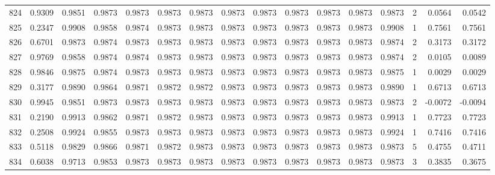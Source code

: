 \begin{tabular}{lrrrrrrrrrrrrrrr}
824 &      0.9309 &  0.9851 &  0.9873 &  0.9873 &  0.9873 &  0.9873 &  0.9873 &  0.9873 &  0.9873 &  0.9873 &   0.9873 &     0.9873 &      2 &                    0.0564 &                     0.0542 \\
825 &      0.2347 &  0.9908 &  0.9858 &  0.9874 &  0.9873 &  0.9873 &  0.9873 &  0.9873 &  0.9873 &  0.9873 &   0.9873 &     0.9908 &      1 &                    0.7561 &                     0.7561 \\
826 &      0.6701 &  0.9873 &  0.9874 &  0.9873 &  0.9873 &  0.9873 &  0.9873 &  0.9873 &  0.9873 &  0.9873 &   0.9873 &     0.9874 &      2 &                    0.3173 &                     0.3172 \\
827 &      0.9769 &  0.9858 &  0.9874 &  0.9874 &  0.9873 &  0.9873 &  0.9873 &  0.9873 &  0.9873 &  0.9873 &   0.9873 &     0.9874 &      2 &                    0.0105 &                     0.0089 \\
828 &      0.9846 &  0.9875 &  0.9874 &  0.9873 &  0.9873 &  0.9873 &  0.9873 &  0.9873 &  0.9873 &  0.9873 &   0.9873 &     0.9875 &      1 &                    0.0029 &                     0.0029 \\
829 &      0.3177 &  0.9890 &  0.9864 &  0.9871 &  0.9872 &  0.9872 &  0.9873 &  0.9873 &  0.9873 &  0.9873 &   0.9873 &     0.9890 &      1 &                    0.6713 &                     0.6713 \\
830 &      0.9945 &  0.9851 &  0.9873 &  0.9873 &  0.9873 &  0.9873 &  0.9873 &  0.9873 &  0.9873 &  0.9873 &   0.9873 &     0.9873 &      2 &                   -0.0072 &                    -0.0094 \\
831 &      0.2190 &  0.9913 &  0.9862 &  0.9871 &  0.9872 &  0.9873 &  0.9873 &  0.9873 &  0.9873 &  0.9873 &   0.9873 &     0.9913 &      1 &                    0.7723 &                     0.7723 \\
832 &      0.2508 &  0.9924 &  0.9855 &  0.9873 &  0.9873 &  0.9873 &  0.9873 &  0.9873 &  0.9873 &  0.9873 &   0.9873 &     0.9924 &      1 &                    0.7416 &                     0.7416 \\
833 &      0.5118 &  0.9829 &  0.9866 &  0.9871 &  0.9872 &  0.9873 &  0.9873 &  0.9873 &  0.9873 &  0.9873 &   0.9873 &     0.9873 &      5 &                    0.4755 &                     0.4711 \\
834 &      0.6038 &  0.9713 &  0.9853 &  0.9873 &  0.9873 &  0.9873 &  0.9873 &  0.9873 &  0.9873 &  0.9873 &   0.9873 &     0.9873 &      3 &                    0.3835 &                     0.3675 \\

\end{tabular}
